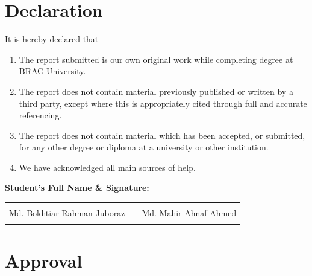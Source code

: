 \documentclass[12pt,a4paper]{report}  %
\begin{document}
\newpage
\thispagestyle{empty}

\chapter*{Declaration}
{}

It is hereby declared that

\begin{enumerate}
\item The report submitted is our own original work while completing degree at BRAC University.

\item The report does not contain material previously published or written by a third party, except where this is appropriately cited through full and accurate referencing.

\item The report does not contain material which has been accepted, or submitted, for any other degree or diploma at a university or other institution.

\item We have acknowledged all main sources of help.
\end{enumerate}

\vspace{2cm}

\textbf{Student's Full Name \& Signature:}

\vspace{2cm}

\begin{tabularx}{\linewidth}{@{}L{5.5cm}C{1.0cm}L{5.5cm}@{}}
\hrulefill & & \hrulefill \\
\centering Md. Bokhtiar Rahman Juboraz & & \centering Md. Mahir Ahnaf Ahmed \tabularnewline
{} & &  \tabularnewline
\end{tabularx}

\newpage
\thispagestyle{empty}

\chapter*{Approval}
{}
\end{document}
